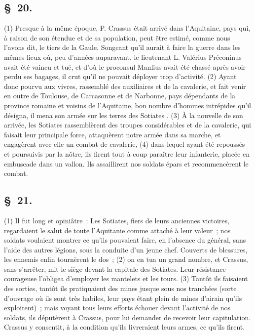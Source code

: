 \documentclass[french,twoside]{book} %
\begin{document}
\subsection[{§ 20.}]{ \textsc{§ 20.} }
\noindent (1) Presque à la même époque, P. Crassus était arrivé dans l’Aquitaine, pays qui, à raison de son étendue et de sa population, peut être estimé, comme nous l’avons dit, le tiers de la Gaule. Songeant qu’il aurait à faire la guerre dans les mêmes lieux où, peu d’années auparavant, le lieutenant L. Valérius Préconinus avait été vaincu et tué, et d’où le proconsul Manlius avait été chassé après avoir perdu ses bagages, il crut qu’il ne pouvait déployer trop d’activité. (2) Ayant donc pourvu aux vivres, rassemblé des auxiliaires et de la cavalerie, et fait venir en outre de Toulouse, de Carcasonne et de Narbonne, pays dépendants de la province romaine et voisins de l’Aquitaine, bon nombre d’hommes intrépides qu’il désigna, il mena son armée sur les terres des Sotiates . (3) À la nouvelle de son arrivée, les Sotiates rassemblèrent des troupes considérables et de la cavalerie, qui faisait leur principale force, attaquèrent notre armée dans sa marche, et engagèrent avec elle un combat de cavalerie, (4) dans lequel ayant été repoussés et poursuivis par la nôtre, ils firent tout à coup paraître leur infanterie, placée en embuscade dans un vallon. Ils assaillirent nos soldats épars et recommencèrent le combat.
\subsection[{§ 21.}]{ \textsc{§ 21.} }
\noindent (1) Il fut long et opiniâtre : Les Sotiates, fiers de leurs anciennes victoires, regardaient le salut de toute l’Aquitanie comme attaché à leur valeur ; nos soldats voulaient montrer ce qu’ils pouvaient faire, en l’absence du général, sans l’aide des autres légions, sous la conduite d’un jeune chef. Couverts de blessures, les ennemis enfin tournèrent le dos ; (2) on en tua un grand nombre, et Crassus, sans s’arrêter, mit le siège devant la capitale des Sotiates. Leur résistance courageuse l’obligea d’employer les mantelets et les tours. (3) Tantôt ils faisaient des sorties, tantôt ils pratiquaient des mines jusque sous nos tranchées (sorte d’ouvrage où ils sont très habiles, leur pays étant plein de mines d’airain qu’ils exploitent) ; mais voyant tous leurs efforts échouer devant l’activité de nos soldats, ils députèrent à Crassus, pour lui demander de recevoir leur capitulation. Crassus y consentit, à la condition qu’ils livreraient leurs armes, ce qu’ils firent.
\end{document}
